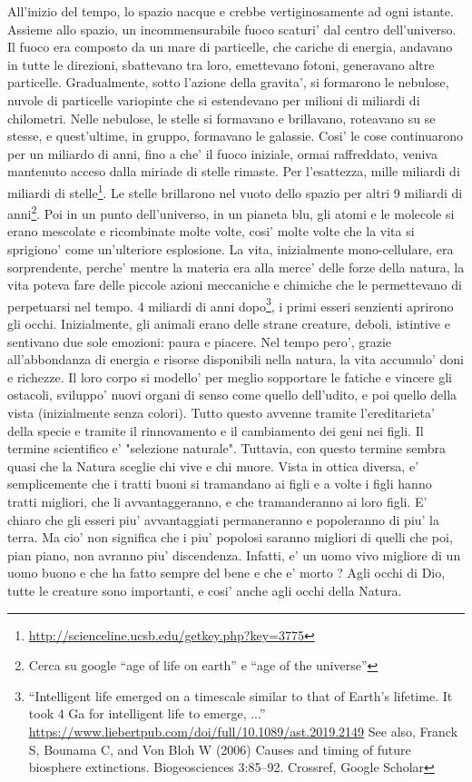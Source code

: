 {All'inizio del tempo, lo spazio nacque e crebbe vertiginosamente ad ogni istante. Assieme allo spazio, un incommensurabile fuoco scaturi' dal centro dell'universo. Il fuoco era composto da un mare di particelle, che cariche di energia, andavano in tutte le direzioni, sbattevano tra loro, emettevano fotoni, generavano altre particelle.
Gradualmente, sotto l'azione della gravita', si formarono le nebulose, nuvole di particelle variopinte che si estendevano per milioni di miliardi di chilometri.
Nelle nebulose, le stelle si formavano e brillavano, roteavano su se stesse, e quest'ultime, in gruppo, formavano le galassie.
  Cosi' le cose continuarono per un miliardo di anni, fino a che' il fuoco iniziale, ormai raffreddato, veniva mantenuto acceso dalla miriade di stelle rimaste. Per l'esattezza, mille miliardi di miliardi di stelle\footnote{\url{http://scienceline.ucsb.edu/getkey.php?key=3775}}. 
  Le stelle brillarono nel vuoto dello spazio per altri 9 miliardi di anni\footnote{Cerca su google ``age of life on earth'' e ``age of the universe''}. Poi in un punto dell'universo, in un pianeta blu, gli atomi e le molecole si erano mescolate e ricombinate molte volte, cosi' molte volte che la vita si sprigiono' come un'ulteriore esplosione. La vita, inizialmente mono-cellulare, era sorprendente, perche' mentre la materia era alla merce' delle forze della natura, la vita poteva fare delle piccole azioni meccaniche e chimiche che le permettevano di perpetuarsi nel tempo.
 4 miliardi di anni dopo\footnote{``Intelligent life emerged on a timescale similar to that of Earth's lifetime. It took 4 Ga for intelligent life to emerge, ...''
    \url{https://www.liebertpub.com/doi/full/10.1089/ast.2019.2149}  See also, Franck S, Bounama C, and Von Bloh W (2006) Causes and timing of future biosphere extinctions. Biogeosciences 3:85–92. Crossref, Google Scholar}, i primi esseri senzienti aprirono gli occhi. Inizialmente, gli animali erano delle strane creature, deboli, istintive e sentivano due sole emozioni: paura e piacere. Nel tempo pero', grazie all'abbondanza di energia e risorse disponibili nella natura, la vita accumulo' doni e richezze. Il loro corpo si modello' per meglio sopportare le fatiche e vincere gli ostacoli, sviluppo' nuovi organi di senso come quello dell'udito, e poi quello della vista (inizialmente senza colori). Tutto questo avvenne tramite l'ereditarieta' della specie e tramite il rinnovamento e il cambiamento dei geni nei figli.
Il termine scientifico e' "selezione naturale". Tuttavia, con questo termine sembra quasi che la Natura sceglie chi vive e chi muore. Vista in ottica diversa, e' semplicemente che i tratti buoni si tramandano ai figli e a volte i figli hanno tratti migliori, che li avvantaggeranno, e che tramanderanno ai loro figli. E' chiaro che gli esseri piu' avvantaggiati permaneranno e popoleranno di piu' la terra. Ma cio' non significa che i piu' popolosi saranno migliori di quelli che poi, pian piano, non avranno piu' discendenza. Infatti, e' un uomo vivo migliore di un uomo buono e che ha fatto sempre del bene e che e' morto ? Agli occhi di Dio, tutte le creature sono importanti, e cosi' anche agli occhi della Natura.

}
